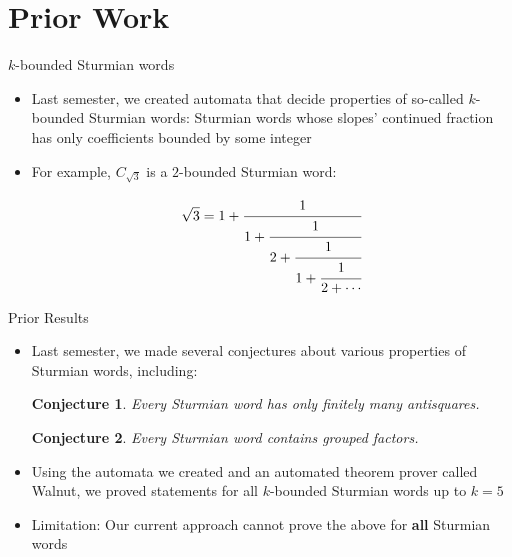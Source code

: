 \documentclass[leqno,presentation]{beamer}
\newtheorem*{conjecture}{Conjecture}
\begin{document}

\section{Prior Work}

\begin{frame}{$k$-bounded Sturmian words}
    \begin{itemize}
        \item Last semester, we created automata that decide properties of so-called $k$-bounded Sturmian words: Sturmian words whose slopes' continued fraction has only coefficients bounded by some integer
        
        \item For example, $C_{\sqrt{3}}$ is a $2$-bounded Sturmian word:
        
        \[
            \sqrt{3} = 1 + \cfrac{1}{1 + \cfrac{1}{2 + \cfrac{1}{1 + \cfrac{1}{2 + \cdots}}}}
        \]

    \end{itemize}
\end{frame}

\begin{frame}{Prior Results}
    \begin{itemize}
        \item Last semester, we made several conjectures about various properties of Sturmian words, including:
        
            \begin{conjecture}\label{conj:antisq}
                Every Sturmian word has only finitely many antisquares.
            \end{conjecture}
                        
            \begin{conjecture}\label{conj:grouped}
                Every Sturmian word contains grouped factors.
            \end{conjecture}
        
        \item Using the automata we created and an automated theorem prover called Walnut, we proved statements for all $k$-bounded Sturmian words up to $k = 5$
        
        \item Limitation: Our current approach cannot prove the above for \textbf{all} Sturmian words
    \end{itemize}
\end{frame}
\end{document}
